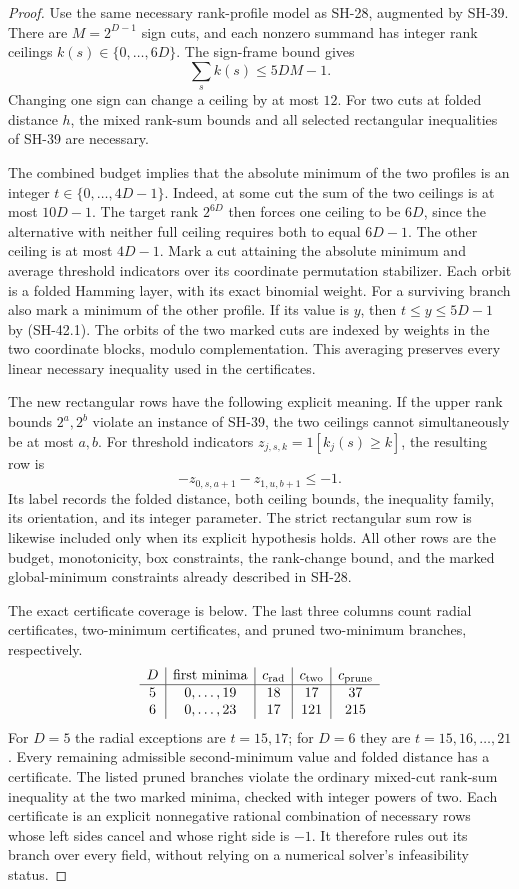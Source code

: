 \begin{proof}
Use the same necessary rank-profile model as SH-28,
augmented by SH-39.  There are $M=2^{D-1}$ sign cuts,
and each nonzero summand has integer rank ceilings
$k(s)\in\{0,\ldots,6D\}$.  The sign-frame bound gives
\[
 \sum_s k(s)\le5DM-1.                         \tag{SH-42.1}
\]
Changing one sign can change a ceiling by at most
$12$.  For two cuts at folded distance $h$, the
mixed rank-sum bounds and all selected rectangular
inequalities of SH-39 are necessary.

The combined budget implies that the absolute
minimum of the two profiles is an integer
$t\in\{0,\ldots,4D-1\}$.  Indeed, at some cut the
sum of the two ceilings is at most $10D-1$.
The target rank $2^{6D}$ then forces one ceiling
to be $6D$, since the alternative with neither
full ceiling requires both to equal $6D-1$.
The other ceiling is at most $4D-1$.
Mark a cut attaining the absolute minimum and
average threshold indicators over its coordinate
permutation stabilizer.  Each orbit is a folded
Hamming layer, with its exact binomial weight.
For a surviving branch also mark a minimum of
the other profile.  If its value is $y$, then
$t\le y\le5D-1$ by (SH-42.1).  The orbits of
the two marked cuts are indexed by weights in
the two coordinate blocks, modulo complementation.
This averaging preserves every linear necessary
inequality used in the certificates.

The new rectangular rows have the following
explicit meaning.  If the upper rank bounds
$2^a,2^b$ violate an instance of SH-39, the two
ceilings cannot simultaneously be at most $a,b$.
For threshold indicators $z_{j,s,k}=1[k_j(s)\ge k]$,
the resulting row is
\[
 -z_{0,s,a+1}-z_{1,u,b+1}\le-1.                \tag{SH-42.2}
\]
Its label records the folded distance, both
ceiling bounds, the inequality family, its
orientation, and its integer parameter.  The
strict rectangular sum row is likewise included
only when its explicit hypothesis holds.
All other rows are the budget, monotonicity,
box constraints, the rank-change bound, and the
marked global-minimum constraints already
described in SH-28.

The exact certificate coverage is below.  The last
three columns count radial certificates, two-minimum
certificates, and pruned two-minimum branches,
respectively.
\[
\begin{array}{c|c|c|c|c}
D&\text{first minima}&c_{\rm rad}&c_{\rm two}&c_{\rm prune}\\\hline
5&0,\ldots,19&18&17&37\\
6&0,\ldots,23&17&121&215
\end{array}
\]
For $D=5$ the radial exceptions are $t=15,17$;
for $D=6$ they are $t=15,16,\ldots,21$.
Every remaining admissible second-minimum value
and folded distance has a certificate.  The
listed pruned branches violate the ordinary
mixed-cut rank-sum inequality at the two marked
minima, checked with integer powers of two.
Each certificate is an explicit nonnegative
rational combination of necessary rows whose
left sides cancel and whose right side is $-1$.
It therefore rules out its branch over every
field, without relying on a numerical solver's
infeasibility status.


\end{proof}
